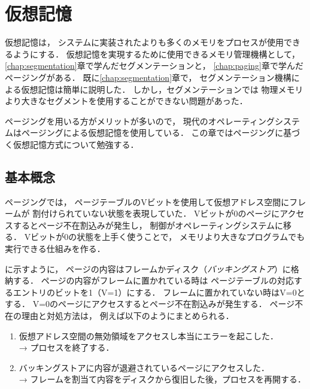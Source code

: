 \chapter{仮想記憶}
仮想記憶は，
システムに実装されたよりも多くのメモリをプロセスが使用できるようにする．
仮想記憶を実現するために使用できるメモリ管理機構として，
\ref{chap:segmentation}章で学んだセグメンテーションと，
\ref{chap:paging}章で学んだページングがある．
既に\ref{chap:segmentation}章で，
セグメンテーション機構による仮想記憶は簡単に説明した．
しかし，セグメンテーションでは
物理メモリより大きなセグメントを使用することができない問題があった．

ページングを用いる方がメリットが多いので，
現代のオペレーティングシステムはページングによる仮想記憶を使用している．
この章ではページングに基づく仮想記憶方式について勉強する．

\section{基本概念}
ページングでは，
ページテーブルのVビットを使用して仮想アドレス空間にフレームが
割付けられていない状態を表現していた．
Vビットが0のページにアクセスするとページ不在割込みが発生し，
制御がオペレーティングシステムに移る．
Vビットが0の状態を上手く使うことで，
メモリより大きなプログラムでも実行できる仕組みを作る．

に示すように，
ページの内容はフレームかディスク（\emph{バッキングストア}）に格納する．
ページの内容がフレームに置かれている時は
ページテーブルの対応するエントリのビットを1（V=1）にする．
フレームに置かれていない時はV=0とする．
V=0のページにアクセスするとページ不在割込みが発生する．
ページ不在の理由と対処方法は，
例えば以下のようにまとめられる．

\begin{enumerate}
\item 仮想アドレス空間の無効領域をアクセスし本当にエラーを起こした．\\
  → プロセスを終了する．
\item バッキングストアに内容が退避されているページにアクセスした．\\
  → フレームを割当て内容をディスクから復旧した後，プロセスを再開する．
\end{enumerate}

